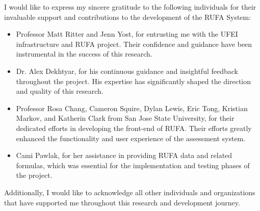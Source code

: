 \begin{acknowledgments}

    I would like to express my sincere gratitude to the following individuals for their invaluable support and contributions to the development of the RUFA System:

    \begin{itemize}
        \item Professor Matt Ritter and Jenn Yost, for entrusting me with the UFEI infrastructure and RUFA project. Their confidence and guidance have been instrumental in the success of this research.
        \item Dr. Alex Dekhtyar, for his continuous guidance and insightful feedback throughout the project. His expertise has significantly shaped the direction and quality of this research.
        \item Professor Rosa Chang, Cameron Squire, Dylan Lewis, Eric Tong, Kristian Markov, and Katherin Clark from San Jose State University, for their dedicated efforts in developing the front-end of RUFA. Their efforts greatly enhanced the functionality and user experience of the assessment system.
        \item Cami Pawlak, for her assistance in providing RUFA data and related formulas, which was essential for the implementation and testing phases of the project.
    \end{itemize}

    Additionally, I would like to acknowledge all other individuals and organizations that have supported me throughout this research and development journey.

\end{acknowledgments}
